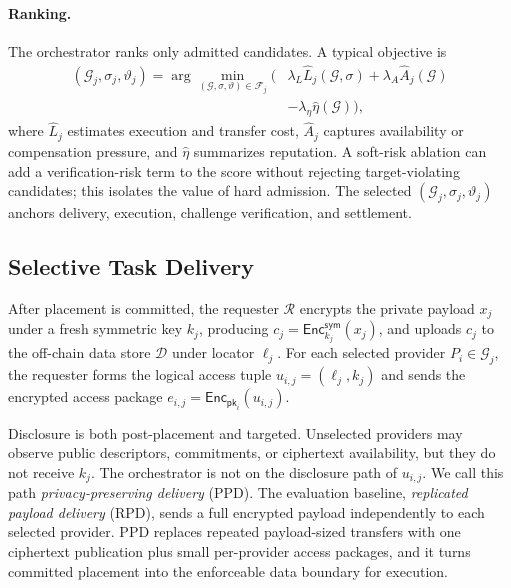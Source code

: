 \documentclass[sigplan,screen,review,anonymous]{acmart}
\begin{document}
\paragraph{Ranking.}
The orchestrator ranks only admitted candidates. A typical objective is
\begin{equation}
\begin{aligned}
(\mathcal{G}_j,\sigma_j,\vartheta_j)
  = \arg\min_{(\mathcal{G},\sigma,\vartheta)\in\mathcal{F}_j}
  \big(&\lambda_L \widehat{L}_j(\mathcal{G},\sigma)
      + \lambda_A \widehat{A}_j(\mathcal{G})\\
      &- \lambda_\eta \widehat{\eta}(\mathcal{G})\big),
\end{aligned}
\label{eq:placement-objective}
\end{equation}
where \(\widehat{L}_j\) estimates execution and transfer cost,
\(\widehat{A}_j\) captures availability or compensation pressure, and
\(\widehat{\eta}\) summarizes reputation. A soft-risk ablation can add a
verification-risk term to the score without rejecting target-violating
candidates; this isolates the value of hard admission. The selected
\((\mathcal{G}_j,\sigma_j,\vartheta_j)\) anchors delivery, execution,
challenge verification, and settlement.

\subsection{Selective Task Delivery}
\label{subsec:selective-delivery}

After placement is committed, the requester \(\mathcal{R}\) encrypts the
private payload \(x_j\) under a fresh symmetric key \(k_j\), producing
\(c_j=\mathsf{Enc}^{\mathsf{sym}}_{k_j}(x_j)\), and uploads \(c_j\) to the
off-chain data store \(\mathcal{D}\) under locator \(\ell_j\). For each
selected provider
\(P_i\in\mathcal{G}_j\), the requester forms the logical access tuple
\(u_{i,j}=(\ell_j,k_j)\) and sends the encrypted access package
\(e_{i,j}=\mathsf{Enc}_{\mathsf{pk}_i}(u_{i,j})\).

Disclosure is both post-placement and targeted. Unselected providers may
observe public descriptors, commitments, or ciphertext availability, but
they do not receive \(k_j\). The orchestrator is not on the disclosure path
of \(u_{i,j}\). We call this path \emph{privacy-preserving delivery} (PPD).
The evaluation baseline, \emph{replicated payload delivery} (RPD), sends a
full encrypted payload independently to each selected provider. PPD replaces
repeated payload-sized transfers with one ciphertext publication plus small
per-provider access packages, and it turns committed placement into the
enforceable data boundary for execution.
\end{document}
